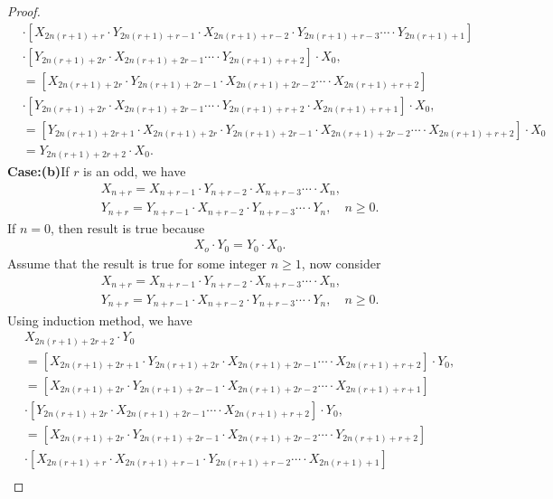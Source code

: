 \begin{proof}
\begin{align*}
&\cdot\left[X_{2n(r+1)+r}\cdot Y_{2n(r+1)+r-1}\cdot X_{2n(r+1)+r-2}\cdot Y_{2n(r+1)+r-3}\cdots\cdot Y_{2n(r+1)+1}\right]\\
&\cdot\left[Y_{2n(r+1)+2r}\cdot X_{2n(r+1)+2r-1}\cdots\cdot Y_{2n(r+1)+r+2}\right]\cdot X_{0},\\
&=\left[X_{2n(r+1)+2r}\cdot Y_{2n(r+1)+2r-1}\cdot X_{2n(r+1)+2r-2}\cdots\cdot X_{2n(r+1)+r+2}\right]\\
&\cdot\left[Y_{2n(r+1)+2r}\cdot X_{2n(r+1)+2r-1}\cdots\cdot Y_{2n(r+1)+r+2}\cdot X_{2n(r+1)+r+1}\right]\cdot X_{0},\\
&=\left[Y_{2n(r+1)+2r+1}\cdot X_{2n(r+1)+2r}\cdot Y_{2n(r+1)+2r-1}\cdot X_{2n(r+1)+2r-2}\cdots\cdot X_{2n(r+1)+r+2}\right]\cdot X_{0}\\
&=Y_{2n(r+1)+2r+2}\cdot X_{0}.
\end{align*}
\textbf{Case:(b)}If $r$ is an odd, we have
\begin{align*}
	&	X_{n+r}=X_{n+r-1}\cdot Y_{n+r-2}\cdot X_{n+r-3}\cdots\cdot X_{n},\\
	&Y_{n+r}=Y_{n+r-1}\cdot X_{n+r-2}\cdot Y_{n+r-3}\cdots\cdot Y_{n},\quad n\geq 0.
		\end{align*}
		If $n=0$, then result is true because
\begin{align*}
&X_{o}\cdot Y_{0}=Y_{0}\cdot X_{0}.
	\end{align*}
	Assume that the result is true for some integer $n\geq1$, now consider
\begin{align*}
&	X_{n+r}=X_{n+r-1}\cdot Y_{n+r-2}\cdot X_{n+r-3}\cdots\cdot X_{n},\\
	&Y_{n+r}=Y_{n+r-1}\cdot X_{n+r-2}\cdot Y_{n+r-3}\cdots\cdot Y_{n},\quad n\geq 0.
		\end{align*}
		Using induction method, we have
\begin{align*}
&X_{2n(r+1)+2r+2}\cdot Y_{0}\\&=\left[X_{2n(r+1)+2r+1}\cdot Y_{2n(r+1)+2r}\cdot X_{2n(r+1)+2r-1}\cdots\cdot X_{2n(r+1)+r+2}\right]\cdot Y_{0},\\
&=\left[X_{2n(r+1)+2r}\cdot Y_{2n(r+1)+2r-1}\cdot X_{2n(r+1)+2r-2}\cdots\cdot X_{2n(r+1)+r+1}\right]\\
&\cdot\left[Y_{2n(r+1)+2r}\cdot X_{2n(r+1)+2r-1}\cdots\cdot X_{2n(r+1)+r+2}\right]\cdot Y_{0},\\
&=\left[X_{2n(r+1)+2r}\cdot Y_{2n(r+1)+2r-1}\cdot X_{2n(r+1)+2r-2}\cdots\cdot Y_{2n(r+1)+r+2}\right]\\
&\cdot\left[X_{2n(r+1)+r}\cdot X_{2n(r+1)+r-1}\cdot Y_{2n(r+1)+r-2}\cdots\cdot X_{2n(r+1)+1}\right]\\

\end{align*}
\end{proof}
